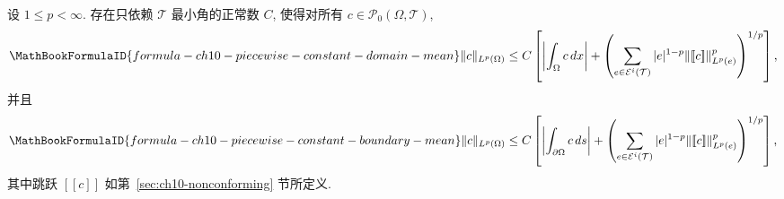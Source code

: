 \begin{Lemma}
\label{lem:ch10-piecewise-constant-poincare}
设 $1\leq p<\infty$. 存在只依赖 $\mathcal T$ 最小角的正常数 $C$, 使得对所有 $c\in\mathcal P_0(\Omega,\mathcal T)$,
\begin{equation}
\MathBookFormulaID{formula-ch10-piecewise-constant-domain-mean}
\label{eq:ch10-piecewise-constant-domain-mean}
\|c\|_{L^p(\Omega)}\leq C\left[
\left|\int_\Omega c\,dx\right|
+\left(\sum_{e\in\mathcal E^i(\mathcal T)}|e|^{1-p}
\|[\![c]\!]\|_{L^p(e)}^p\right)^{1/p}\right],
\end{equation}
并且
\begin{equation}
\MathBookFormulaID{formula-ch10-piecewise-constant-boundary-mean}
\label{eq:ch10-piecewise-constant-boundary-mean}
\|c\|_{L^p(\Omega)}\leq C\left[
\left|\int_{\partial\Omega}c\,ds\right|
+\left(\sum_{e\in\mathcal E^i(\mathcal T)}|e|^{1-p}
\|[\![c]\!]\|_{L^p(e)}^p\right)^{1/p}\right],
\end{equation}
其中跳跃 $[\![c]\!]$ 如第~\ref{sec:ch10-nonconforming} 节所定义.
\end{Lemma}

